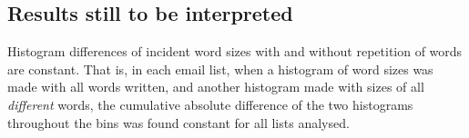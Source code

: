 																																																																																																																																																																																																																																																																																																																																																																																																				\subsection{Results still to be interpreted}\label{subsec:sii}
																																																																																																																																																																																																																																																																																																																																																																																																				Histogram differences of incident word sizes with and without repetition of words are constant.
																																																																																																																																																																																																																																																																																																																																																																																																				That is, in each email list, when a histogram of word sizes was made with all words written, and another histogram made with sizes of all \emph{different} words, the cumulative absolute difference of the two histograms throughout the bins was found constant for all lists analysed.
